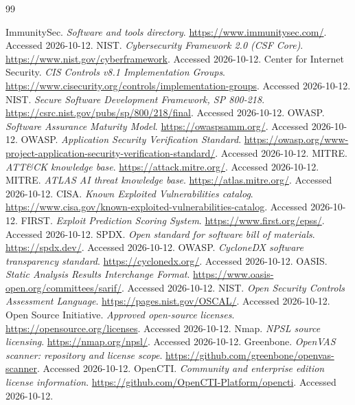 \documentclass[11pt,oneside]{report}
\begin{document}
\begin{thebibliography}{99}

 ImmunitySec. \emph{Software and tools directory}. \url{https://www.immunitysec.com/}. Accessed 2026-10-12.
 NIST. \emph{Cybersecurity Framework 2.0 (CSF Core)}. \url{https://www.nist.gov/cyberframework}. Accessed 2026-10-12.
 Center for Internet Security. \emph{CIS Controls v8.1 Implementation Groups}. \url{https://www.cisecurity.org/controls/implementation-groups}. Accessed 2026-10-12.
 NIST. \emph{Secure Software Development Framework, SP 800-218}. \url{https://csrc.nist.gov/pubs/sp/800/218/final}. Accessed 2026-10-12.
 OWASP. \emph{Software Assurance Maturity Model}. \url{https://owaspsamm.org/}. Accessed 2026-10-12.
 OWASP. \emph{Application Security Verification Standard}. \url{https://owasp.org/www-project-application-security-verification-standard/}. Accessed 2026-10-12.
 MITRE. \emph{ATT\&CK knowledge base}. \url{https://attack.mitre.org/}. Accessed 2026-10-12.
 MITRE. \emph{ATLAS AI threat knowledge base}. \url{https://atlas.mitre.org/}. Accessed 2026-10-12.
 CISA. \emph{Known Exploited Vulnerabilities catalog}. \url{https://www.cisa.gov/known-exploited-vulnerabilities-catalog}. Accessed 2026-10-12.
 FIRST. \emph{Exploit Prediction Scoring System}. \url{https://www.first.org/epss/}. Accessed 2026-10-12.
 SPDX. \emph{Open standard for software bill of materials}. \url{https://spdx.dev/}. Accessed 2026-10-12.
 OWASP. \emph{CycloneDX software transparency standard}. \url{https://cyclonedx.org/}. Accessed 2026-10-12.
 OASIS. \emph{Static Analysis Results Interchange Format}. \url{https://www.oasis-open.org/committees/sarif/}. Accessed 2026-10-12.
 NIST. \emph{Open Security Controls Assessment Language}. \url{https://pages.nist.gov/OSCAL/}. Accessed 2026-10-12.
 Open Source Initiative. \emph{Approved open-source licenses}. \url{https://opensource.org/licenses}. Accessed 2026-10-12.
 Nmap. \emph{NPSL source licensing}. \url{https://nmap.org/npsl/}. Accessed 2026-10-12.
 Greenbone. \emph{OpenVAS scanner: repository and license scope}. \url{https://github.com/greenbone/openvas-scanner}. Accessed 2026-10-12.
 OpenCTI. \emph{Community and enterprise edition license information}. \url{https://github.com/OpenCTI-Platform/opencti}. Accessed 2026-10-12.

\end{thebibliography}
\end{document}
